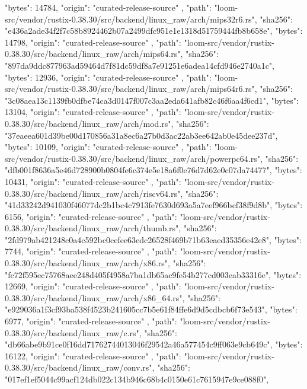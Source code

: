 {{      "bytes": 14784,
      "origin": "curated-release-source"
    },
    {
      "path": "loom-src/vendor/rustix-0.38.30/src/backend/linux_raw/arch/mips32r6.rs",
      "sha256": "e436a2ade34f2f7c58b8924462b07a2499dfc951e1e1318d51759444fb8b658e",
      "bytes": 14798,
      "origin": "curated-release-source"
    },
    {
      "path": "loom-src/vendor/rustix-0.38.30/src/backend/linux_raw/arch/mips64.rs",
      "sha256": "897da9ddc877963ad59464d7f81dc59df8a7e91251e6adea14cfd946e2740a1c",
      "bytes": 12936,
      "origin": "curated-release-source"
    },
    {
      "path": "loom-src/vendor/rustix-0.38.30/src/backend/linux_raw/arch/mips64r6.rs",
      "sha256": "3c08aea13c1139fb0dfbe74ca3d0147f007c3aa2eda641afb82c46f6aa4f6cd1",
      "bytes": 13104,
      "origin": "curated-release-source"
    },
    {
      "path": "loom-src/vendor/rustix-0.38.30/src/backend/linux_raw/arch/mod.rs",
      "sha256": "37eaeea601d39be00d170856a31a8ec6a27b0d3ac22ab3ee642ab0e45dee237d",
      "bytes": 10109,
      "origin": "curated-release-source"
    },
    {
      "path": "loom-src/vendor/rustix-0.38.30/src/backend/linux_raw/arch/powerpc64.rs",
      "sha256": "dfb001f8636a5e46d728900b0804fe6c374e5e18a6f0e76d7d62e0c07da74477",
      "bytes": 10431,
      "origin": "curated-release-source"
    },
    {
      "path": "loom-src/vendor/rustix-0.38.30/src/backend/linux_raw/arch/riscv64.rs",
      "sha256": "41d33242d941030f46077dc2b1bc4c7913fe7630d693a5a7eef966bcf38f9d8b",
      "bytes": 6156,
      "origin": "curated-release-source"
    },
    {
      "path": "loom-src/vendor/rustix-0.38.30/src/backend/linux_raw/arch/thumb.rs",
      "sha256": "2fd979ab421248c0a4c592bc0cefee63edc26528f469b71b63eaed35356e42e8",
      "bytes": 7744,
      "origin": "curated-release-source"
    },
    {
      "path": "loom-src/vendor/rustix-0.38.30/src/backend/linux_raw/arch/x86.rs",
      "sha256": "fc72f595ec75768aee248d405f4958a7ba1db65ac9fe54b277cd003eab33316e",
      "bytes": 12669,
      "origin": "curated-release-source"
    },
    {
      "path": "loom-src/vendor/rustix-0.38.30/src/backend/linux_raw/arch/x86_64.rs",
      "sha256": "e929036a1f3cf93ba538f4523b241605cc7b5e61f84ffe6d9d5cdbcb6f73e543",
      "bytes": 6977,
      "origin": "curated-release-source"
    },
    {
      "path": "loom-src/vendor/rustix-0.38.30/src/backend/linux_raw/c.rs",
      "sha256": "db66abe9b91ce0f16dd71762744013046f29542a46a577454c9ff063e9cb649c",
      "bytes": 16122,
      "origin": "curated-release-source"
    },
    {
      "path": "loom-src/vendor/rustix-0.38.30/src/backend/linux_raw/conv.rs",
      "sha256": "017ef1ef5044c99acf124db022c134b946c68b4c0150e61c7615947e9ce088f0",
}}
